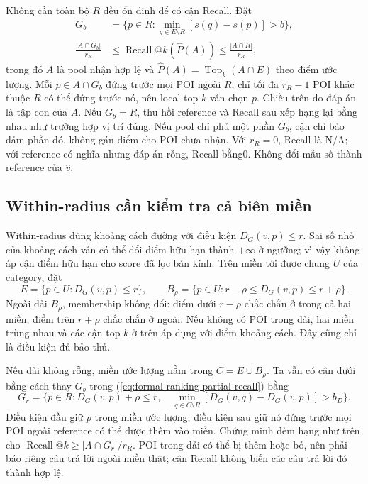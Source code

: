 Không cần toàn bộ $R$ đều ổn định để có cận Recall. Đặt
\begin{equation}
 \begin{split}
 G_b&=\{p\in R:\min_{q\in E\setminus R}[s(q)-s(p)]>b\},\\
 \frac{|A\cap G_b|}{r_R}&\leq
 \operatorname{Recall}@k(\hat P(A))\leq\frac{|A\cap R|}{r_R},
 \end{split}
 \label{eq:formal-ranking-partial-recall}
\end{equation}
trong đó $A$ là pool nhận hợp lệ và
$\hat P(A)=\operatorname{Top}_k(A\cap E)$ theo điểm ước lượng.
Mỗi $p\in A\cap G_b$ đứng trước mọi POI ngoài $R$; chỉ tối đa $r_R-1$
POI khác thuộc $R$ có thể đứng trước nó, nên local top-$k$ vẫn chọn $p$.
Chiều trên do đáp án là tập con của $A$. Nếu $G_b=R$, thu hồi reference
và Recall sau xếp hạng lại bằng nhau như trường hợp vị trí đúng. Nếu
pool chỉ phủ một phần $G_b$, cận chỉ bảo đảm phần đó, không gán điểm cho
POI chưa nhận. Với $r_R=0$, Recall là N/A; với reference có nghĩa nhưng
đáp án rỗng, Recall bằng0. Không đổi mẫu số thành reference của $\hat v$.

\subsection{Within-radius cần kiểm tra cả biên miền}
\label{sec:formal-ranking-radius-band}

Within-radius dùng khoảng cách đường với điều kiện $D_G(v,p)\leq r$.
Sai số nhỏ của khoảng cách vẫn có thể đổi điểm hữu hạn thành $+\infty$
ở ngưỡng; vì vậy không áp cận điểm hữu hạn cho score đã lọc bán kính.
Trên miền tới được chung $U$ của category, đặt
\begin{equation}
 E=\{p\in U:D_G(v,p)\leq r\},\qquad
 B_\rho=\{p\in U:r-\rho\leq D_G(v,p)\leq r+\rho\}.
 \label{eq:formal-ranking-radius-band}
\end{equation}
Ngoài dải $B_\rho$, membership không đổi: điểm dưới $r-\rho$ chắc chắn
ở trong cả hai miền; điểm trên $r+\rho$ chắc chắn ở ngoài. Nếu không
có POI trong dải, hai miền trùng nhau và các cận top-$k$ ở trên áp dụng
với điểm khoảng cách. Đây cũng chỉ là điều kiện đủ bảo thủ.

Nếu dải không rỗng, miền ước lượng nằm trong $C=E\cup B_\rho$.
Ta vẫn có cận dưới bằng cách thay $G_b$ trong
(\ref{eq:formal-ranking-partial-recall}) bằng
\begin{equation}
 G_{r}=\{p\in R:D_G(v,p)+\rho\leq r,\quad
 \min_{q\in C\setminus R}[D_G(v,q)-D_G(v,p)]>b_D\}.
 \label{eq:formal-ranking-radius-stable}
\end{equation}
Điều kiện đầu giữ $p$ trong miền ước lượng; điều kiện sau giữ nó đứng
trước mọi POI ngoài reference có thể được thêm vào miền. Chứng minh
đếm hạng như trên cho $\operatorname{Recall}@k\geq|A\cap G_r|/r_R$.
POI trong dải có thể bị thêm hoặc bỏ, nên phải báo riêng câu trả lời
ngoài miền thật; cận Recall không biến các câu trả lời đó thành hợp lệ.

